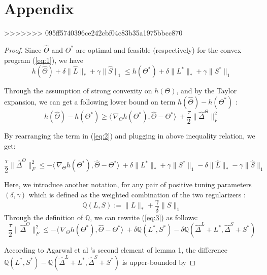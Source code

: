 \documentclass[AMS,STIX1COL]{WileyNJD-v2}
\begin{document}
\section{Appendix}
>>>>>>> 095ff5740396ce242cbf04c83b35a1975bbcc870
\begin{proof}
Since $\widehat{\Theta}$ and $\Theta^{*}$ are optimal and feasible (respectively) for the convex program (\ref{eq:1}), we have
\begin{equation}\label{eq:2}
    h(\widehat{\Theta}) + \delta\|\widehat{L}\|_{*} + \gamma\|\widehat{S}\|_{1} \leq  
     h(\Theta^{*}) + \delta\|{L^{*}}\|_{*} + \gamma\|{S}^{*}\|_{1}
\end{equation}

Through the assumption of strong convexity on $h(\Theta)$, and by the Taylor expansion, we can get a following lower bound on term $h(\widehat{\Theta})-h(\Theta^{*})$ :
\[
h(\widehat{\Theta})-h(\Theta^{*}) \geq 
\langle\, \nabla_{\Theta}h(\Theta^{*}),\widehat{\Theta}-\Theta^{*}\rangle\ + \frac{\tau}{2}\|\widehat{\Delta}^{\Theta}\|_{F}^{2}
\]

By rearranging the term in (\ref{eq:2}) and plugging in above inequality relation, we get:

\begin{equation}\label{eq:3}
    \frac{\tau}{2}\|\widehat{\Delta}^{\Theta}\|_{F}^{2} \leq
    -\langle\,\nabla_{\Theta}h(\Theta^{*}),\widehat{\Theta}-\Theta^{*}\rangle\
    + \delta \|L^{*}\|_\ast + \gamma \|S^{*}\|_1 
    - \delta \|\widehat{L}\|_\ast - \gamma \|\widehat{S}\|_1
\end{equation}

Here, we introduce another notation, for any pair of positive tuning parameters $(\delta,\gamma)$ which is defined as the weighted combination of the two regularizers : 
\[
\mathbb{Q}(L,S)   := \|L\|_{*} + \frac{\gamma}{\delta}\|S\|_1
\]
Through the definition of $\mathbb{Q}$, we can rewrite (\ref{eq:3}) as follows:
\begin{equation}\label{eq:4}
    \frac{\tau}{2}\|\widehat{\Delta}^{\Theta}\|_{F}^{2} \leq
    -\langle\,\nabla_{\Theta}h(\Theta^{*}),\widehat{\Theta}-\Theta^{*}\rangle\
    + \delta \mathbb{Q}(L^{*},S^{*}) - \delta \mathbb{Q}(\widehat{\Delta}^L + L^{*},\widehat{\Delta}^S + S^{*})
\end{equation}

According to Agarwal et al \cite{agarwal2012noisy}'s second element of lemma 1, 
the difference $\mathbb{Q}(L^*,S^*)- \mathbb{Q}(\widehat{\Delta}^L + L^{*},\widehat{\Delta}^S + S^{*})$ is upper-bounded by 


\end{proof}
\end{document}
